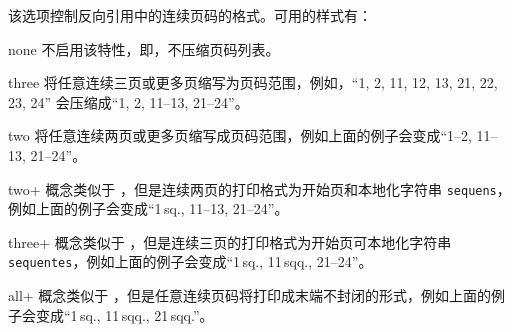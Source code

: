 \begin{optionlist}

该选项控制反向引用中的连续页码的格式。可用的样式有：

\begin{valuelist}

\item[none] %
不启用该特性，即，不压缩页码列表。

\item[three] %
将任意连续三页或更多页缩写为页码范围，例如，“1, 2, 11, 12, 13, 21, 22, 23, 24” 会压缩成“1, 2, 11--13, 21--24”。

\item[two] %
将任意连续两页或更多页缩写成页码范围，例如上面的例子会变成“1--2, 11--13, 21--24”。

\item[two+] %
概念类似于 ，但是连续两页的打印格式为开始页和本地化字符串 \texttt{sequens}，例如上面的例子会变成“1\,sq., 11--13, 21--24”。

\item[three+] %
概念类似于 ，但是连续三页的打印格式为开始页可本地化字符串 \texttt{sequentes}，例如上面的例子会变成“1\,sq., 11\,sqq., 21--24”。

\item[all+] %
概念类似于 ，但是任意连续页码将打印成末端不封闭的形式，例如上面的例子会变成“1\,sq., 11\,sqq., 21\,sqq.”。


\end{valuelist}
\end{optionlist}
